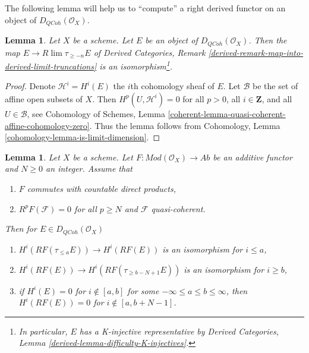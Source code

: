 \documentclass{stacks-project}
\theoremstyle{plain}
\newtheorem{lemma}[subsection]{Lemma}
\theoremstyle{definition}
\theoremstyle{remark}
\numberwithin{equation}{subsection}
\def\lim{\mathop{\mathrm{lim}}\nolimits}
\def\QCoh{\mathit{QCoh}}
\begin{document}
\noindent
The following lemma will help us to ``compute'' a right derived functor
on an object of $D_\QCoh(\mathcal{O}_X)$.

\begin{lemma}
\label{lemma-nice-K-injective}
Let $X$ be a scheme. Let $E$ be an object of
$D_\QCoh(\mathcal{O}_X)$. Then the map $E \to R\lim \tau_{\geq -n}E$ of
Derived Categories, Remark
\ref{derived-remark-map-into-derived-limit-truncations}
is an isomorphism\footnote{In particular,
$E$ has a K-injective representative by
Derived Categories, Lemma \ref{derived-lemma-difficulty-K-injectives}.}.
\end{lemma}

\begin{proof}
Denote $\mathcal{H}^i = H^i(E)$ the $i$th cohomology sheaf of $E$.
Let $\mathcal{B}$ be the set of affine open subsets of $X$. Then
$H^p(U, \mathcal{H}^i) = 0$ for all $p > 0$, all $i \in \mathbf{Z}$,
and all $U \in \mathcal{B}$, see
Cohomology of Schemes, Lemma
\ref{coherent-lemma-quasi-coherent-affine-cohomology-zero}.
Thus the lemma follows from
Cohomology, Lemma \ref{cohomology-lemma-is-limit-dimension}.
\end{proof}

\begin{lemma}
\label{lemma-application-nice-K-injective}
Let $X$ be a scheme. Let $F : \textit{Mod}(\mathcal{O}_X) \to \textit{Ab}$
be an additive functor and $N \geq 0$ an integer. Assume that
\begin{enumerate}
\item $F$ commutes with countable direct products,
\item $R^pF(\mathcal{F}) = 0$ for all $p \geq N$ and $\mathcal{F}$
quasi-coherent.
\end{enumerate}
Then for $E \in D_\QCoh(\mathcal{O}_X)$
\begin{enumerate}
\item $H^i(RF(\tau_{\leq a}E)) \to H^i(RF(E))$ is an isomorphism
for $i \leq a$,
\item $H^i(RF(E)) \to H^i(RF(\tau_{\geq b - N + 1}E))$ is an isomorphism
for $i \geq b$,
\item if $H^i(E) = 0$ for $i \not \in [a, b]$ for some
$-\infty \leq a \leq b \leq \infty$, then $H^i(RF(E)) = 0$
for $i \not \in [a, b + N - 1]$.
\end{enumerate}
\end{lemma}
\end{document}
